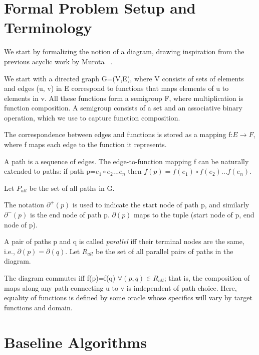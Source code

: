 \documentclass[sigplan,review,anonymous]{acmart}
\begin{document}
\section{Formal Problem Setup and Terminology}

We start by formalizing the notion of a diagram, drawing inspiration from the previous acyclic work by Murota ~\cite{commutative}.


We start with a directed graph G=(V,E), where V consists of sets of elements and edges (u, v) in E correspond to functions that maps elements of u to elements in v.
All these functions form a semigroup F, where multiplication is function composition.
A semigroup consists of a set and an associative binary operation, which we use to capture function composition.

The correspondence between edges and functions is stored as a mapping f:$E\rightarrow F$, where f maps each edge to the function it represents.

A path is a sequence of edges. The edge-to-function mapping f can be naturally extended to paths: if path p=$e_1\circ e_2 ... e_n$ then $f(p)=f(e_1) \circ f(e_2) ... f(e_n)$.

Let $P_{all}$ be the set of all paths in G.

The notation $\partial^{+}(p)$ is used to indicate the start node of path p, and similarly $\partial^-(p)$ is the end node of path p.  $\partial(p)$ maps to the tuple (start node of p, end node of p).

A pair of paths p and q is called \textit{parallel} iff their terminal nodes are the same, i.e., $\partial(p)=\partial(q)$.
Let $R_{all}$ be the set of all parallel pairs of paths in the diagram.

The diagram commutes iff f(p)=f(q) $\forall (p,q)\in R_{all}$; that is, the composition of maps along any path connecting u to v is independent of path choice. Here, equality of functions is defined by some oracle whose specifics will vary by target functions and domain.

\section{Baseline Algorithms}
\end{document}
